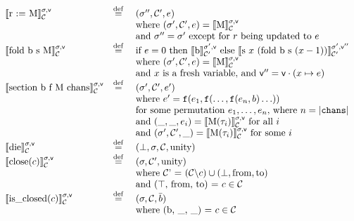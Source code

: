 \documentclass{article}
\newcommand{\m}[1]{\ensuremath{\llbracket #1\rrbracket}}
\begin{document}
\[\begin{array}{lcl}
  \m{\text{r := M}}^{\state, \envir}_\channels & \defn{} &
    (\state'', \channels', e)\\
    && \text{where $(\state', \channels', e) = \m{\text{M}}^{\state, \envir}_\channels$}\\
    && \text{and $\sigma'' = \sigma'$ except for $r$ being updated to $e$}\\

  \m{\text{fold b s M}}^{\state, \envir}_\channels & \defn{} &
    \text{if $e = 0$ then $\m{\text{b}}^{\state', \envir}_{\channels'}$ else
    $\m{\text{s $x$ (fold b s ($x - 1$))}}^{\state', \envir''}_{\channels'}$} \\
    && \text{where $(\state', \channels', e) = \m{\text{M}}^{\state, \envir}_\channels$}\\
    && \text{and $x$ is a fresh variable, and $\envir'' = \envir \cdot (x \mapsto e)$}\\

  \m{\text{section b f M chans}}^{\state, \envir}_\channels & \defn{} &
    (\state', \channels', e')\\
    && \text{where $e' = \mathtt{f}(e_1, \mathtt{f}(\ldots, \mathtt{f}(e_n, b)\ldots))$}\\
    && \text{for some permutation $e_1,\ldots,e_n$, where $n = |\mathtt{chans}|$}\\
    && \text{and $(\_, \_, e_i) = \m{\text{M}(\tau_i)}^{\state, \envir}_{\channels}$ for all $i$}\\
    && \text{and $(\state', \channels', \_) = \m{\text{M}(\tau_i)}^{\state, \envir}_{\channels}$ for some $i$}\\

  \m{\text{die}}^{\state, \envir}_\channels & \defn{} &
    (\bot, \state, \channels, \text{unity})\\

  \m{\text{close($c$)}}^{\state, \envir}_\channels & \defn{} &
    (\state, \channels', \text{unity})\\
    && \text{where \channels' = $(\channels \backslash c) \cup
      (\bot, \mathrm{from}, \mathrm{to})$}\\
    && \text{and ($\top$, from, to) = $c \in \channels$}\\

  \m{\text{is\_closed($c$)}}^{\state, \envir}_\channels & \defn{} &
      (\state, \channels, \bar{b})\\
    && \text{where (b, \_, \_) = $c \in \channels$}\\

\end{array}
\]
\end{document}
